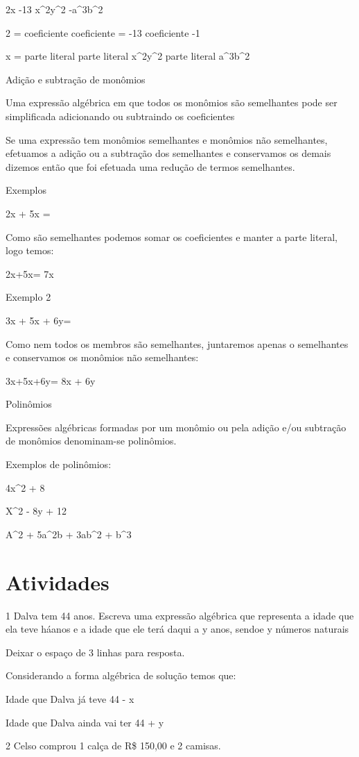 2x -13 x^2y^2 -a^3b^2

2 = coeficiente coeficiente = -13 coeficiente -1

x = parte literal parte literal x^2y^2 parte literal a^3b^2

Adição e subtração de monômios

Uma expressão algébrica em que todos os monômios são semelhantes pode
ser simplificada adicionando ou subtraindo os coeficientes

Se uma expressão tem monômios semelhantes e monômios não semelhantes,
efetuamos a adição ou a subtração dos semelhantes e conservamos os
demais dizemos então que foi efetuada uma redução de termos semelhantes.

Exemplos

2x + 5x =

Como são semelhantes podemos somar os coeficientes e manter a parte
literal, logo temos:

2x+5x= 7x

Exemplo 2

3x + 5x + 6y=

Como nem todos os membros são semelhantes, juntaremos apenas o
semelhantes e conservamos os monômios não semelhantes:

3x+5x+6y= 8x + 6y

Polinômios

Expressões algébricas formadas por um monômio ou pela adição e/ou
subtração de monômios denominam-se polinômios.

Exemplos de polinômios:

4x^2 + 8

X^2 - 8y + 12

A^2 + 5a^2b + 3ab^2 + b^3

\section{Atividades}

\num{1} Dalva tem 44 anos. Escreva uma expressão algébrica que representa a
idade que ela teve há\times anos e a idade que ele terá daqui a y anos,
sendo\times e y números naturais

Deixar o espaço de 3 linhas para resposta.

Considerando a forma algébrica de solução temos que:

Idade que Dalva já teve 44 - x

Idade que Dalva ainda vai ter 44 + y

\num{2} Celso comprou 1 calça de R\$ 150,00 e 2 camisas.

